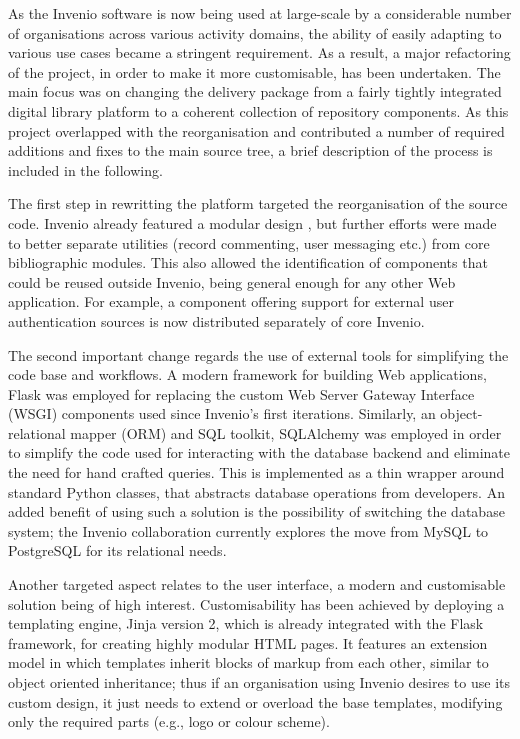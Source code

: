 
As the Invenio software is now being used at large-scale by a considerable
number of organisations across various activity domains, the ability of easily
adapting to various use cases became a stringent requirement. As a result, a
major refactoring of the project, in order to make it more customisable, has
been undertaken. The main focus was on changing the delivery package from a
fairly tightly integrated digital library platform to a coherent collection of
repository components. As this project overlapped with the reorganisation and
contributed a number of required additions and fixes to the main source tree, a
brief description of the process is included in the following.

The first step in rewritting the platform targeted the reorganisation of the
source code. Invenio already featured a modular design \cite{ref:lemeur}, but
further efforts were made to better separate utilities (record commenting, user
messaging etc.) from core bibliographic modules. This also allowed the
identification of components that could be reused outside Invenio, being
general enough for any other Web application. For example, a component offering
support for external user authentication sources is now distributed separately
of core Invenio.

The second important change regards the use of external tools for simplifying
the code base and workflows. A modern framework for building Web applications,
Flask \cite{ref:flask} was employed for replacing the custom Web Server Gateway
Interface (WSGI) components used since Invenio's first iterations. Similarly,
an object-relational mapper (ORM) and SQL toolkit, SQLAlchemy
\cite{ref:sqlalchemy} was employed in order to simplify the code used for
interacting with the database backend and eliminate the need for hand crafted
queries. This is implemented as a thin wrapper around standard Python classes,
that abstracts database operations from developers. An added benefit of using
such a solution is the possibility of switching the database system; the
Invenio collaboration currently explores the move from MySQL to PostgreSQL for
its relational needs.

Another targeted aspect relates to the user interface, a modern and
customisable solution being of high interest. Customisability has been achieved
by deploying a templating engine, Jinja version 2, which is already integrated
with the Flask framework, for creating highly modular HTML pages. It features
an extension model in which templates inherit blocks of markup from each other,
similar to object oriented inheritance; thus if an organisation using Invenio
desires to use its custom design, it just needs to extend or overload the base
templates, modifying only the required parts (e.g., logo or colour scheme).

